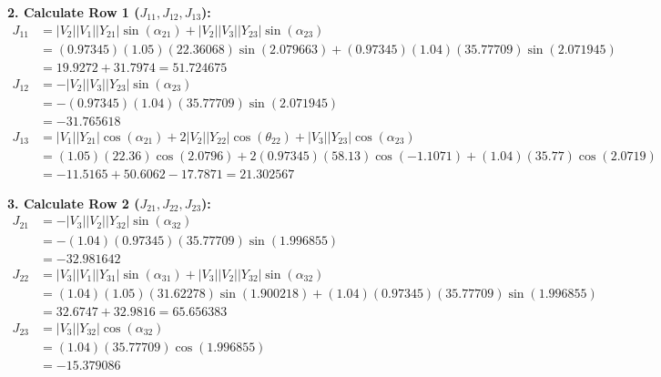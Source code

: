 \documentclass[11pt]{article}
\begin{document}
\begin{stepbox}
\textbf{2. Calculate Row 1 ($J_{11}, J_{12}, J_{13}$):}
\begin{align*}
    J_{11} &= |V_2||V_1||Y_{21}|\sin(\alpha_{21}) + |V_2||V_3||Y_{23}|\sin(\alpha_{23}) \\
    &= (0.97345)(1.05)(22.36068)\sin(2.079663) + (0.97345)(1.04)(35.77709)\sin(2.071945) \\
    &= 19.9272 + 31.7974 = \mathbf{51.724675} \\[0.3cm]
    J_{12} &= -|V_2||V_3||Y_{23}|\sin(\alpha_{23}) \\
    &= -(0.97345)(1.04)(35.77709)\sin(2.071945) \\
    &= \mathbf{-31.765618} \\[0.3cm]
    J_{13} &= |V_1||Y_{21}|\cos(\alpha_{21}) + 2|V_2||Y_{22}|\cos(\theta_{22}) + |V_3||Y_{23}|\cos(\alpha_{23}) \\
    &= (1.05)(22.36)\cos(2.0796) + 2(0.97345)(58.13)\cos(-1.1071) + (1.04)(35.77)\cos(2.0719) \\
    &= -11.5165 + 50.6062 - 17.7871 = \mathbf{21.302567}
\end{align*}

\textbf{3. Calculate Row 2 ($J_{21}, J_{22}, J_{23}$):}
\begin{align*}
    J_{21} &= -|V_3||V_2||Y_{32}|\sin(\alpha_{32}) \\
    &= -(1.04)(0.97345)(35.77709)\sin(1.996855) \\
    &= \mathbf{-32.981642} \\[0.3cm]
    J_{22} &= |V_3||V_1||Y_{31}|\sin(\alpha_{31}) + |V_3||V_2||Y_{32}|\sin(\alpha_{32}) \\
    &= (1.04)(1.05)(31.62278)\sin(1.900218) + (1.04)(0.97345)(35.77709)\sin(1.996855) \\
    &= 32.6747 + 32.9816 = \mathbf{65.656383} \\[0.3cm]
    J_{23} &= |V_3||Y_{32}|\cos(\alpha_{32}) \\
    &= (1.04)(35.77709)\cos(1.996855) \\
    &= \mathbf{-15.379086}
\end{align*}


\end{stepbox}
\end{document}
